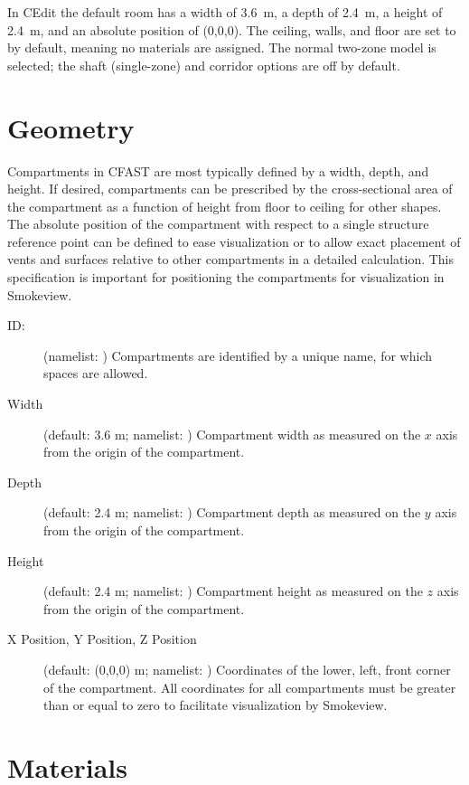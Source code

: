 In CEdit the default room has a width of 3.6~m, a depth of 2.4~m, a height of 2.4~m, and an absolute position of (0,0,0). The ceiling, walls, and floor are set to  by default, meaning no materials are assigned. The normal two-zone model is selected; the shaft (single-zone) and corridor options are off by default.

\section{Geometry}
\label{info:COMP}
\label{Compartment_Geometry}

Compartments in CFAST are most typically defined by a width, depth, and height.  If desired, compartments can be prescribed by the cross-sectional area of the compartment as a function of height from floor to ceiling for other shapes. The absolute position of the compartment with respect to a single structure reference point can be defined to ease visualization or to allow exact placement of vents and surfaces relative to other compartments in a detailed calculation. This specification is important for positioning the compartments for visualization in Smokeview.

\begin{description}
\item[ ID:] (namelist: ) Compartments are identified by a unique name, for which spaces are allowed.

\item[Width] (default: 3.6 m; namelist: ) Compartment width as measured on the $x$ axis from the origin of the compartment.

\item[Depth] (default: 2.4 m; namelist: ) Compartment depth as measured on the $y$ axis from the origin of the compartment.

\item[Height] (default: 2.4 m; namelist: )  Compartment height as measured on the $z$ axis from the origin of the compartment.

\item[X Position, Y Position, Z Position] (default: (0,0,0) m; namelist: ) Coordinates of the lower, left, front corner of the compartment. All coordinates for all compartments must be greater than or equal to zero to facilitate visualization by Smokeview.
\end{description}



\section{Materials}
\label{info:COMP2}

